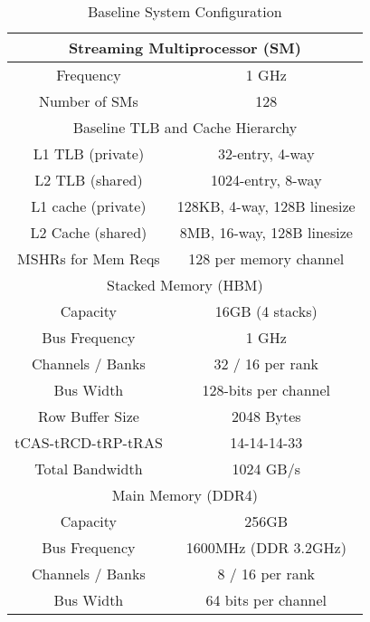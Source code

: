 \begin {table}[h]
\begin{center} 
\vspace{-0.1in}
\caption{Baseline System Configuration}
\vspace{-0. in}
\begin{tabular}{|c|c|}
\hline
     \multicolumn{2}{|c|}{Streaming Multiprocessor (SM)}               \\ \hline
     Frequency            &  1 GHz                                    \\ 
     Number of SMs        &  128                                        \\ \hline
     \multicolumn{2}{|c|}{Baseline TLB and Cache Hierarchy}            \\ \hline
     L1 TLB   (private)   &  32-entry, 4-way                \\ 
     L2 TLB   (shared)    &  1024-entry, 8-way            \\ \hline
     L1 cache (private)   &  128KB,  4-way, 128B linesize  \\ 
     L2 Cache (shared)    &  8MB, 16-way, 128B linesize \\
     MSHRs for Mem Reqs   &  128 per memory channel  \\ \hline
     \multicolumn{2}{|c|}{Stacked Memory (HBM)}            \\ \hline
     Capacity             &  16GB (4 stacks)          \\
     Bus Frequency        &  1 GHz     \\ 
     Channels / Banks    &  32  / 16 per rank        \\
     Bus Width            &  128-bits per channel    \\ 
     Row Buffer Size      &  2048 Bytes              \\
     \small{tCAS-tRCD-tRP-tRAS}   &  14-14-14-33     \\ 
     Total Bandwidth      &  1024 GB/s              \\ \hline
     \multicolumn{2}{|c|}{Main Memory (DDR4)}               \\ \hline
     Capacity             &  256GB                   \\
     Bus Frequency        &  1600MHz (DDR 3.2GHz)    \\ 
     Channels / Banks    &  8  / 16 per rank        \\
     Bus Width            &  64 bits per channel     \\ 

\end{tabular}
\end{center}
\end{table}
